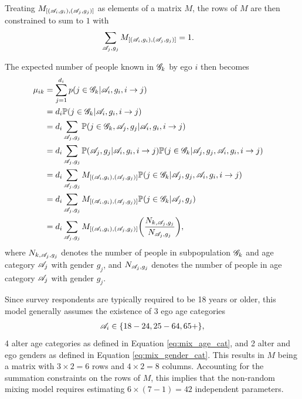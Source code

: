 Treating $M_{[(\mathcal{A}_i,g_i),(\mathcal{A}_j,g_j)]}$ as elements of a matrix $M$, the rows of $M$ are then constrained to sum to $1$ with
\begin{align}
\sum_{\mathcal{A}_j, g_j} M_{[(\mathcal{A}_i,g_i),(\mathcal{A}_j,g_j)]} &= 1. 
\end{align}

The expected number of people known in $\mathcal{G}_k$ by ego $i$ then becomes
\begin{align}
\mu_{ik} 
&= \sum_{j=1}^{d_i} p( j \in \mathcal{G}_k | \mathcal{A}_i, g_i, i \to j ) && \label{eq:nonrandom_mixing_matrix_derivation} \\\nonumber
&= d_i \mathbb{P}( j \in \mathcal{G}_k | \mathcal{A}_i, g_i, i \to j) && \\\nonumber
&= d_i \sum_{\mathcal{A}_j,g_j} \mathbb{P}( j \in \mathcal{G}_k, \mathcal{A}_j, g_j | \mathcal{A}_i, g_i, i \to j) && \\\nonumber
&= d_i \sum_{\mathcal{A}_j,g_j} \mathbb{P}(\mathcal{A}_j, g_j | \mathcal{A}_i, g_i, i \to j) \mathbb{P}( j \in \mathcal{G}_k | \mathcal{A}_j, g_j, \mathcal{A}_i, g_i, i \to j) && \\\nonumber
&= d_i \sum_{\mathcal{A}_j,g_j} M_{[(\mathcal{A}_i,g_i),(\mathcal{A}_j,g_j)]}  \mathbb{P}( j \in \mathcal{G}_k | \mathcal{A}_j, g_j, \mathcal{A}_i, g_i, i \to j) && \\\nonumber
&= d_i \sum_{\mathcal{A}_j,g_j} M_{[(\mathcal{A}_i,g_i),(\mathcal{A}_j,g_j)]} \mathbb{P}( j \in \mathcal{G}_k | \mathcal{A}_j, g_j)  && \\\nonumber
&= d_i \sum_{\mathcal{A}_j,g_j} M_{[(\mathcal{A}_i,g_i),(\mathcal{A}_j,g_j)]} \biggl( \frac{N_{k, \mathcal{A}_j, g_j}}{N_{\mathcal{A}_j, g_j}} \biggr),
\end{align}
where $N_{k, \mathcal{A}_j, g_j}$ denotes the number of people in subpopulation $\mathcal{G}_k$ and age category $\mathcal{A}_j$ with gender $g_j$, and $N_{\mathcal{A}_j, g_j}$ denotes the number of people in age category $\mathcal{A}_j$ with gender $g_j$.

Since survey respondents are typically required to be 18 years or older, this model generally assumes the existence of 3 ego age categories
\begin{align} 
\mathcal{A}_i \in \{18-24, 25-64, 65+\}, 
\end{align}
4 alter age categories as defined in Equation \ref{eq:mix_age_cat}, and 2 alter and ego genders as defined in Equation \ref{eq:mix_gender_cat}. This results in $M$ being a matrix with $3 \times 2 = 6$ rows and $4 \times 2 = 8$ columns. Accounting for the summation constraints on the rows of $M$, this implies that the non-random mixing model requires estimating $6 \times (7-1) = 42$ independent parameters.

